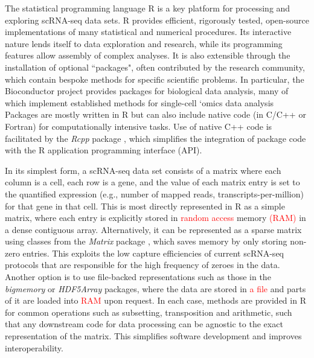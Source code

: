 \documentclass[10pt,letterpaper]{article}
\newcommand{\revised}[1]{\textcolor{red}{#1}}
\begin{document}
The statistical programming language R \cite{R} is a key platform for processing and exploring scRNA-seq data sets.
R provides efficient, rigorously tested, open-source implementations of many statistical and numerical procedures.
Its interactive nature lends itself to data exploration and research, while its programming features allow assembly of complex analyses.
It is also extensible through the installation of optional ``packages", often contributed by the research community, which contain bespoke methods for specific scientific problems.
In particular, the Bioconductor project \cite{gentleman2004bioconductor,huber2015orchestrating} provides packages for biological data analysis, many of which implement established methods for single-cell `omics data analysis \cite{trapnell2014dynamics,lun2016pooling,mccarthy2017scater,finak2015mast}
Packages are mostly written in R but can also include native code (in C/C++ or Fortran) for computationally intensive tasks.
Use of native C++ code is facilitated by the \textit{Rcpp} package \cite{eddelbuettel2011seamless}, which simplifies the integration of package code with the R application programming interface (API).

In its simplest form, a scRNA-seq data set consists of a matrix where each column is a cell, each row is a gene, and the value of each matrix entry is set to the quantified expression (e.g., number of mapped reads, transcripts-per-million) for that gene in that cell.
This is most directly represented in R as a simple matrix, where each entry is explicitly stored in \revised{random access} memory \revised{(RAM)} in a dense contiguous array.
Alternatively, it can be represented as a sparse matrix using classes from the \textit{Matrix} package \cite{bates2017matrix}, which saves memory by only storing non-zero entries.
This exploits the low capture efficiencies of current scRNA-seq protocols \cite{grun2015design} that are responsible for the high frequency of zeroes in the data.
Another option is to use file-backed representations such as those in the \textit{bigmemory} \cite{kane2013scalable} or \textit{HDF5Array} packages, where the data are stored in \revised{a file} and parts of it are loaded into \revised{RAM} upon request.
In each case, methods are provided in R for common operations such as subsetting, transposition and arithmetic, such that any downstream code for data processing can be agnostic to the exact representation of the matrix.
This simplifies software development and improves interoperability.
\end{document}
